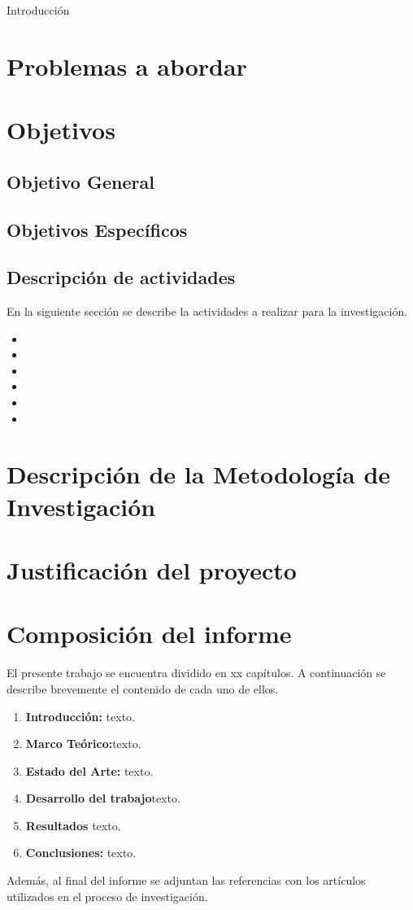 
Introducción

\section{Problemas a abordar}
\section{Objetivos}
\subsection{Objetivo General}
\subsection{Objetivos Específicos}
\subsection{Descripción de actividades}
En la siguiente sección se describe la actividades a realizar para la investigación.
\begin{itemize}
    \item 
    \item 
    \item 
    \item 
    \item 
    \item 
    
\end{itemize}

\section{Descripción de la Metodología de Investigación}

\section{Justificación del proyecto}
\section{Composición del informe}
El presente trabajo se encuentra dividido en xx capítulos. A continuación se describe brevemente el contenido de cada uno de ellos.

\begin{enumerate}
    \item \textbf{Introducción:} texto.

    \item \textbf{Marco Teórico:}texto.
    
    \item \textbf{Estado del Arte:} texto.
    
    \item \textbf{Desarrollo del trabajo}texto.
    
    \item \textbf{Resultados} texto.
    
    \item \textbf{Conclusiones:} texto.
\end{enumerate}
Además, al final del informe se adjuntan las referencias con los artículos utilizados en el proceso de investigación.
